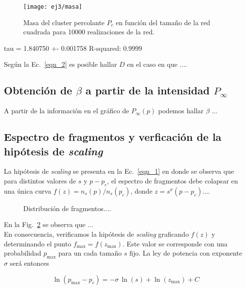 \documentclass[%
 reprint,
 amsmath,amssymb,
 aps,
spanish]{revtex4-1}
\begin{document}
\begin{figure}[h]
  \centering
  \texttt{[image: ej3/masa]}
  \label{fig:2masa}
\caption{Masa del cluster percolante $P_c$ en función del tamaño de la red cuadrada para 10000 realizaciones de la red.}
\label{fig:3}
\end{figure}

tau = 1.840750 +-  0.001758
R-squared:  0.9999

Seg\'un la Ec.~\ref{eqn_2} es posible hallar $D$ en el caso en que ....

\subsection{\label{P} Obtenci\'on de $\beta$ a partir de la intensidad $P_\infty$}

A partir de la informaci\'on en el gr\'afico de $P_\infty(p)$ podemos hallar $\beta$ ...

\subsection{\label{S} Espectro de fragmentos y verficaci\'on de la hip\'otesis de \emph{scaling} }

La hip\'otesis de \emph{scaling} se presenta en la Ec.~\ref{eqn_1} en donde se observa que para distintos valores de $s$ y $p-p_c$, el espectro de fragmentos debe colapsar en una \'unica curva $f(z)=n_s(p)/n_s(p_c)$, donde $z=s^\sigma(p-p_c)$.... 

\begin{figure}[b]
\begin{center}
\caption{Distribuci\'on de fragmentos.... }\label{fig_1}
\end{center}
\end{figure}

En la Fig.~\ref{fig_1} se observa que ... \\


En consecuencia, verificamos la hip\'otesis de \emph{scaling} graficando $f(z)$  y determinando el punto $f_\mathrm{max}=f(z_\mathrm{max})$. Este valor se corresponde con una probabilidad $p_\mathrm{max}$ para un cada tama\~no $s$ fijo. La ley de potencia con exponente $\sigma$ ser\'a entonces

 
\begin{equation}
\ln(p_\mathrm{max}-p_c)=-\sigma\,\ln(s)+\ln(z_\mathrm{max})+C\label{eqn_3}
\end{equation}
\end{document}
